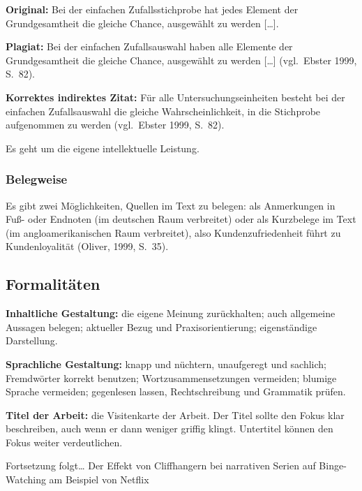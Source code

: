 \documentclass[12pt, a4paper]{article}
\begin{document}
\begin{examplebox}
\textbf{Original:} \glqq Bei der einfachen Zufallsstichprobe hat jedes
Element der Grundgesamtheit die gleiche Chance, ausgewählt zu werden
[\ldots].\grqq{}

\textbf{Plagiat:} \glqq Bei der einfachen Zufallsauswahl haben alle Elemente
der Grundgesamtheit die gleiche Chance, ausgewählt zu werden [\ldots]\grqq{}
(vgl.\ Ebster 1999, S.~82).

\textbf{Korrektes indirektes Zitat:} \glqq Für alle Untersuchungseinheiten
besteht bei der einfachen Zufallsauswahl die gleiche Wahrscheinlichkeit, in
die Stichprobe aufgenommen zu werden\grqq{} (vgl.\ Ebster 1999, S.~82).

Es geht um die eigene intellektuelle Leistung.
\end{examplebox}

\subsubsection{Belegweise}

Es gibt zwei Möglichkeiten, Quellen im Text zu belegen: als Anmerkungen in
Fuß- oder Endnoten (im deutschen Raum verbreitet) oder als Kurzbelege im Text
(im angloamerikanischen Raum verbreitet), also \glqq Kundenzufriedenheit führt
zu Kundenloyalität (Oliver, 1999, S.~35).\grqq{}

\subsection{Formalitäten}

\textbf{Inhaltliche Gestaltung:} die eigene Meinung zurückhalten; auch
allgemeine Aussagen belegen; aktueller Bezug und Praxisorientierung;
eigenständige Darstellung.

\textbf{Sprachliche Gestaltung:} knapp und nüchtern, unaufgeregt und
sachlich; Fremdwörter korrekt benutzen; Wortzusammensetzungen vermeiden;
blumige Sprache vermeiden; gegenlesen lassen, Rechtschreibung und Grammatik
prüfen.

\textbf{Titel der Arbeit:} die Visitenkarte der Arbeit. Der Titel sollte den
Fokus klar beschreiben, auch wenn er dann weniger griffig klingt. Untertitel
können den Fokus weiter verdeutlichen.

\begin{examplebox}
\glqq Fortsetzung folgt\ldots{} Der Effekt von Cliffhangern bei narrativen
Serien auf Binge-Watching am Beispiel von Netflix\grqq{}
\end{examplebox}
\end{document}
